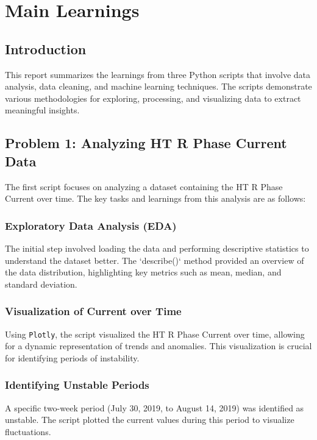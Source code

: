 \section{Main Learnings}

\subsection{Introduction}
This report summarizes the learnings from three Python scripts that involve data analysis, data cleaning, and machine learning techniques. The scripts demonstrate various methodologies for exploring, processing, and visualizing data to extract meaningful insights.

\subsection{Problem 1: Analyzing HT R Phase Current Data}
The first script focuses on analyzing a dataset containing the HT R Phase Current over time. The key tasks and learnings from this analysis are as follows:

\subsubsection{Exploratory Data Analysis (EDA)}
The initial step involved loading the data and performing descriptive statistics to understand the dataset better. The `describe()` method provided an overview of the data distribution, highlighting key metrics such as mean, median, and standard deviation.

\subsubsection{Visualization of Current over Time}
Using \texttt{Plotly}, the script visualized the HT R Phase Current over time, allowing for a dynamic representation of trends and anomalies. This visualization is crucial for identifying periods of instability.

\subsubsection{Identifying Unstable Periods}
A specific two-week period (July 30, 2019, to August 14, 2019) was identified as unstable. The script plotted the current values during this period to visualize fluctuations.

